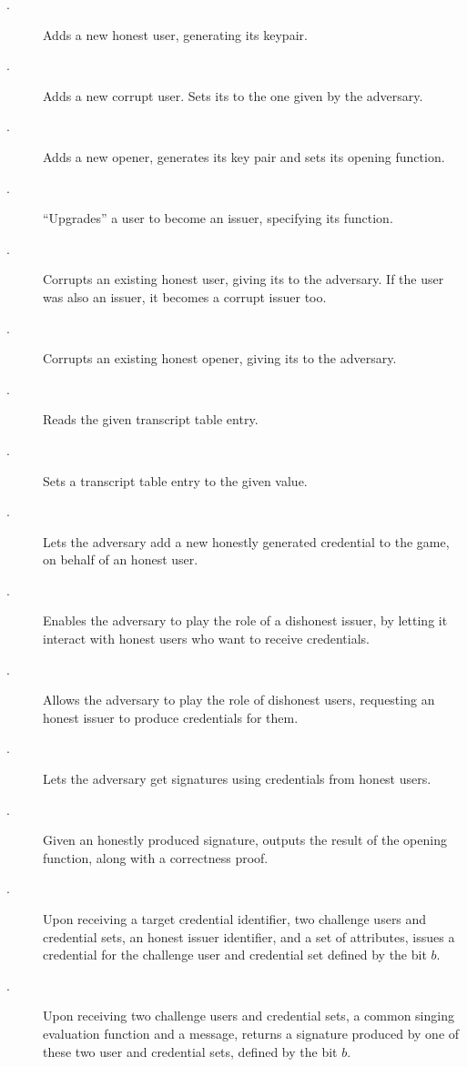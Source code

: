 \begin{description}
\item[\HUGEN.] Adds a new honest user, generating its keypair.
\item[\CUGEN.] Adds a new corrupt user. Sets its \upk to the
  one given by the adversary.  
\item[\OGEN.] Adds a new opener, generates its key pair and sets its opening
  function.
\item[\ISET.] ``Upgrades'' a user to become an issuer, specifying its
  \fissue function.
\item[\UCORR.] Corrupts an existing honest user, giving its \usk to the
  adversary. If the user was also an issuer, it becomes a corrupt issuer too.
\item[\OCORR.] Corrupts an existing honest opener, giving its \osk to the
  adversary.
\item[\RREG.] Reads the given transcript table entry.
\item[\WREG.] Sets a transcript table entry to the given value.
\item[\OBTISS.] Lets the adversary add a new honestly generated credential to
  the game, on behalf of an honest user.
\item[\OBTAIN.] Enables the adversary to play the role of a dishonest issuer, by
  letting it interact with honest users who want to receive credentials.
\item[\ISSUE.] Allows the adversary to play the role of dishonest users,
  requesting an honest issuer to produce credentials for them.
\item[\SIGN.] Lets the adversary get signatures using credentials from honest
  users.
\item[\OPEN.] Given an honestly produced signature, outputs the result of the
  opening function, along with a correctness proof.
\item[\OBTCHALb.] Upon receiving a target credential identifier, two challenge
  users and credential sets, an honest issuer identifier, and a set of
  attributes, issues a credential for the challenge user and credential set
  defined by the bit $b$. 
\item[\CHALb.] Upon receiving two challenge users and credential sets, a common
  singing evaluation function and a message, returns a signature produced by one
  of these two user and credential sets, defined by the bit $b$.
\end{description}

